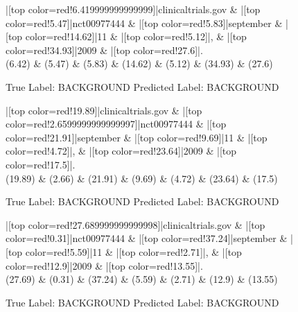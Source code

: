 \documentclass[a4paper, landscape]{article}
\begin{document}
\clearpage
\begin{figure}
\begin{center}
\begin{dependency}
\begin{deptext}
|[top color=red!6.419999999999999]|clinicaltrials.gov \& |[top color=red!5.47]|nct00977444 \& |[top color=red!5.83]|september \& |[top color=red!14.62]|11 \& |[top color=red!5.12]|, \& |[top color=red!34.93]|2009 \& |[top color=red!27.6]|.\\
(6.42) \& (5.47) \& (5.83) \& (14.62) \& (5.12) \& (34.93) \& (27.6)\\
\end{deptext}
\end{dependency}
\end{center}
\caption{True Label: BACKGROUND Predicted Label: BACKGROUND}
\end{figure}
\clearpage
\begin{figure}
\begin{center}
\begin{dependency}
\begin{deptext}
|[top color=red!19.89]|clinicaltrials.gov \& |[top color=red!2.6599999999999997]|nct00977444 \& |[top color=red!21.91]|september \& |[top color=red!9.69]|11 \& |[top color=red!4.72]|, \& |[top color=red!23.64]|2009 \& |[top color=red!17.5]|.\\
(19.89) \& (2.66) \& (21.91) \& (9.69) \& (4.72) \& (23.64) \& (17.5)\\
\end{deptext}
\end{dependency}
\end{center}
\caption{True Label: BACKGROUND Predicted Label: BACKGROUND}
\end{figure}
\clearpage
\begin{figure}
\begin{center}
\begin{dependency}
\begin{deptext}
|[top color=red!27.689999999999998]|clinicaltrials.gov \& |[top color=red!0.31]|nct00977444 \& |[top color=red!37.24]|september \& |[top color=red!5.59]|11 \& |[top color=red!2.71]|, \& |[top color=red!12.9]|2009 \& |[top color=red!13.55]|.\\
(27.69) \& (0.31) \& (37.24) \& (5.59) \& (2.71) \& (12.9) \& (13.55)\\
\end{deptext}
\end{dependency}
\end{center}
\caption{True Label: BACKGROUND Predicted Label: BACKGROUND}
\end{figure}
\end{document}
